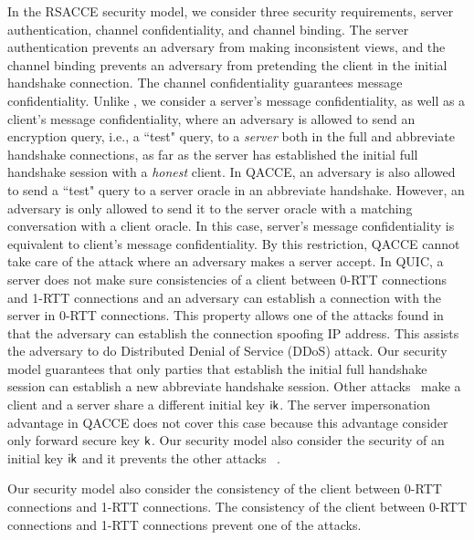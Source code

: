 In the RSACCE security model, we consider three security requirements, 
server authentication, channel confidentiality, and channel binding. 
The server authentication prevents an adversary from making inconsistent views, 
and the channel  binding prevents an adversary from pretending the client in the initial handshake connection.
The channel confidentiality guarantees message confidentiality.   
Unlike \cite{KPW13:SACCE,FG14:QUIC,LJBN15:QUIC}, 
we consider a server's message confidentiality, as well as a client's message
confidentiality, where an adversary is allowed to send 
an encryption query, i.e., a ``test" query, to a \textit{server} 
both in the full and abbreviate handshake connections, 
as far as the server has established the initial full handshake session with a \textit{honest} client.
In QACCE, an adversary 
is also allowed to send a ``test" query to a server oracle in an
abbreviate handshake.
However, an adversary is only allowed
to send it to the server oracle with a matching
conversation with a client oracle.
In this case, server's message confidentiality is 
equivalent to client's message confidentiality.  
By this restriction, QACCE cannot take care of the attack where 
an adversary makes a server accept.
In QUIC, a server does not make sure consistencies of a client
between 0-RTT connections and 1-RTT connections and
an adversary can establish a connection with the server in 0-RTT connections.
This property allows one of the attacks found in~\cite{LJBN15:QUIC} that
the adversary can establish the connection spoofing IP address.
This assists the adversary to do Distributed Denial of Service
(DDoS) attack.
Our security model guarantees that only parties
that establish the initial full handshake session can
establish a new abbreviate handshake session.
Other attacks~\cite{LJBN15:QUIC} make a client and a server share
a different initial key $\mathsf{ik}$.
The server impersonation advantage in QACCE does not
cover this case because this advantage consider only forward
secure key $\mathsf{k}$.
Our security model also consider the security of an initial
key $\mathsf{ik}$ and it prevents the other attacks
~\cite{LJBN15:QUIC}.
\fi

Our security model also consider the consistency of the client between
0-RTT connections and 1-RTT connections.
The consistency of the client between 0-RTT connections
and 1-RTT connections prevent one of the attacks.

